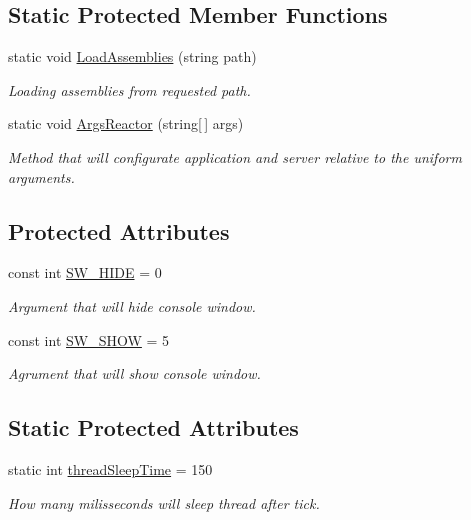 \subsection*{Static Protected Member Functions}
\begin{DoxyCompactItemize}
\item 
static void \mbox{\hyperlink{class_uniform_client_1_1_base_client_a8abbd1d46cc50556eeae8bbd55ce680f}{Load\+Assemblies}} (string path)
\begin{DoxyCompactList}\small\item\em Loading assemblies from requested path. \end{DoxyCompactList}\item 
static void \mbox{\hyperlink{class_uniform_client_1_1_base_client_a7ec48981cf3e7ec10d2cb7dff81f912a}{Args\+Reactor}} (string\mbox{[}$\,$\mbox{]} args)
\begin{DoxyCompactList}\small\item\em Method that will configurate application and server relative to the uniform arguments. \end{DoxyCompactList}\end{DoxyCompactItemize}
\subsection*{Protected Attributes}
\begin{DoxyCompactItemize}
\item 
const int \mbox{\hyperlink{class_uniform_client_1_1_base_client_a6060f2eb1d44ec518f2dfc99c8b4f7aa}{S\+W\+\_\+\+H\+I\+DE}} = 0
\begin{DoxyCompactList}\small\item\em Argument that will hide console window. \end{DoxyCompactList}\item 
const int \mbox{\hyperlink{class_uniform_client_1_1_base_client_a7545b9c72eef6cb7594a7001d3f558e4}{S\+W\+\_\+\+S\+H\+OW}} = 5
\begin{DoxyCompactList}\small\item\em Agrument that will show console window. \end{DoxyCompactList}\end{DoxyCompactItemize}
\subsection*{Static Protected Attributes}
\begin{DoxyCompactItemize}
\item 
static int \mbox{\hyperlink{class_uniform_client_1_1_base_client_a2c4762c1be5eac42b8b5d189530d0952}{thread\+Sleep\+Time}} = 150
\begin{DoxyCompactList}\small\item\em How many milisseconds will sleep thread after tick. \end{DoxyCompactList}\end{DoxyCompactItemize}


